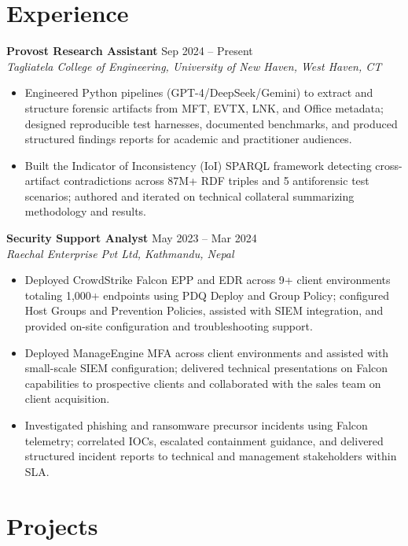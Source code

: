 \documentclass{resume2}
\begin{document}
\section{Experience}

\textbf{Provost Research Assistant} \hfill Sep 2024 -- Present\\
\textit{Tagliatela College of Engineering, University of New Haven, West Haven, CT}
\begin{itemize}[leftmargin=1.2em,itemsep=-3pt,topsep=1pt]
  \item Engineered Python pipelines (GPT-4/DeepSeek/Gemini) to extract and structure forensic artifacts from MFT, EVTX, LNK, and Office metadata; designed reproducible test harnesses, documented benchmarks, and produced structured findings reports for academic and practitioner audiences.
  \item Built the Indicator of Inconsistency (IoI) SPARQL framework detecting cross-artifact contradictions across 87M+ RDF triples and 5 antiforensic test scenarios; authored and iterated on technical collateral summarizing methodology and results.
\end{itemize}

\smallskip
\textbf{Security Support Analyst} \hfill May 2023 -- Mar 2024\\
\textit{Raechal Enterprise Pvt Ltd, Kathmandu, Nepal}
\begin{itemize}[leftmargin=1.2em,itemsep=-3pt,topsep=1pt]
  \item Deployed CrowdStrike Falcon EPP and EDR across 9+ client environments totaling 1,000+ endpoints using PDQ Deploy and Group Policy; configured Host Groups and Prevention Policies, assisted with SIEM integration, and provided on-site configuration and troubleshooting support.
  \item Deployed ManageEngine MFA across client environments and assisted with small-scale SIEM configuration; delivered technical presentations on Falcon capabilities to prospective clients and collaborated with the sales team on client acquisition.
  \item Investigated phishing and ransomware precursor incidents using Falcon telemetry; correlated IOCs, escalated containment guidance, and delivered structured incident reports to technical and management stakeholders within SLA.
\end{itemize}

\section{Projects}
\end{document}
